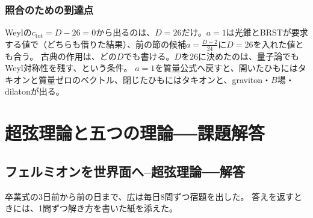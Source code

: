 \documentclass[paper=b5j,fontsize=11Q,jafontsize=11Q,baselineskip=19Q]{jlreq}
\newcommand{\runningtitle}{章題未定}
\numberwithin{equation}{section}
\begin{document}
\subsubsection*{照合のための到達点}
Weylの$c_{\mathrm{tot}}=D-26=0$から出るのは、$D=26$だけ。$a=1$は光錐とBRSTが要求する値で（どちらも借りた結果）、前の節の候補$a=\frac{D-2}{24}$に$D=26$を入れた値とも合う。
古典の作用は、どの$D$でも書ける。$D$を$26$に決めたのは、量子論でもWeyl対称性を残す、という条件。
$a=1$を質量公式へ戻すと、開いたひもにはタキオンと質量ゼロのベクトル、閉じたひもにはタキオンと、graviton・$B$場・dilatonが出る。


\clearpage
\endgroup
\begingroup
\renewcommand{\runningtitle}{解答 第7章　超弦理論}
\section[超弦理論と五つの理論　課題解答]{超弦理論と五つの理論──課題解答}
\subsection[フェルミオンを世界面へ]{フェルミオンを世界面へ--超弦理論──解答}

卒業式の3日前から前の日まで、広は毎日8問ずつ宿題を出した。
答えを返すときには、1問ずつ解き方を書いた紙を添えた。
\end{document}
